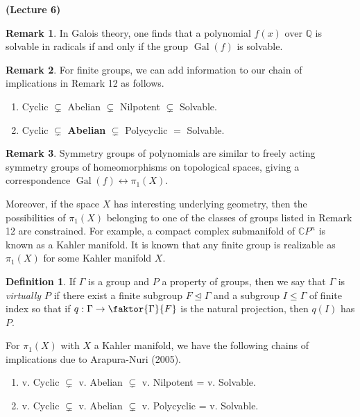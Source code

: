 \documentclass[10pt,letterpaper,cm]{nupset}
\theoremstyle{definition}
\newtheorem*{definition}{Definition}
\newtheorem{remark}{Remark}
\newcommand{\CP}{\mathbb CP}
\newcommand{\Q}{\mathbb Q}
\newcommand{\1}{\mathbf{1}}
\newcommand{\0}{\vec 0}
\DeclareMathOperator{\gal}{Gal}
\begin{document}
\begin{center}
 {\textbf{(Lecture 6)}}
\end{center}

\begin{remark}
In Galois theory, one finds that a polynomial $f(x)$ over $\Q$ is solvable in radicals if and only if the group $\gal(f)$ is solvable. 
\end{remark}

\begin{remark}
For finite groups, we can add information to our chain of implications in Remark 12 as follows.
\begin{enumerate}
\item Cyclic $\subsetneq$ Abelian $\subsetneq$ Nilpotent $\subsetneq$ Solvable.
\item Cyclic $\subsetneq$ \textbf{Abelian} $\subsetneq$ Polycyclic $\bm =$  Solvable.
\end{enumerate}
\end{remark}

\begin{remark}
Symmetry groups of polynomials are similar to freely acting symmetry groups of homeomorphisms on topological spaces, giving a correspondence $\gal(f) \longleftrightarrow \pi_1(X)$. 

Moreover, if the space $X$ has interesting underlying geometry, then the possibilities of $\pi_1(X)$ belonging to one of the classes of groups listed in Remark 12 are constrained. For example,
a compact complex submanifold of $\CP^n$ is known as a Kahler manifold. It is known that any finite group is realizable as $\pi_1(X)$ for some Kahler manifold $X$.
\begin{definition}
If $\Gamma$ is a group and $P$ a property of groups, then we say that $\Gamma$ is \textit{virtually $P$} if there exist a finite subgroup $F \unlhd \Gamma$ and a subgroup $I \leq \Gamma$ of finite index so that if $q: \Gamma \to \faktor{\Gamma}{F}$ is the natural projection, then $q(I)$ has $P$. 
\end{definition}
For $\pi_1(X)$ with $X$ a Kahler manifold, we have the following chains of implications due to Arapura-Nuri (2005).
\begin{enumerate}
\item v. Cyclic $\subsetneq$ v. Abelian $\subsetneq$ v. Nilpotent = v. Solvable.
\item v. Cyclic $\subsetneq$ v. Abelian $\subsetneq$ v. Polycyclic = v. Solvable.
\end{enumerate}
\end{remark}
\end{document}
